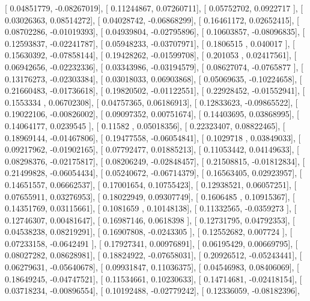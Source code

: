 \documentclass{article}
\begin{document}
       [ 0.04851779, -0.08267019],
       [ 0.11244867,  0.07260711],
       [ 0.05752702,  0.0922717 ],
       [ 0.03026363,  0.08514272],
       [ 0.04028742, -0.06868299],
       [ 0.16461172,  0.02652415],
       [ 0.08702286, -0.01019393],
       [ 0.04939804, -0.02795896],
       [ 0.10603857, -0.08096835],
       [ 0.12593837, -0.02241787],
       [ 0.05948233, -0.03707971],
       [ 0.1806515 ,  0.040017  ],
       [ 0.15630392, -0.07858144],
       [ 0.19428262, -0.01599708],
       [ 0.201053  ,  0.02417561],
       [ 0.06942656, -0.02232336],
       [ 0.03343986, -0.03194579],
       [ 0.08627074, -0.0765877 ],
       [ 0.13176273, -0.02303384],
       [ 0.03018033,  0.06903868],
       [ 0.05069635, -0.10224658],
       [ 0.21660483, -0.01736618],
       [ 0.19820502, -0.01122551],
       [ 0.22928452, -0.01552941],
       [ 0.1553334 ,  0.06702308],
       [ 0.04757365,  0.06186913],
       [ 0.12833623, -0.09865522],
       [ 0.19022106, -0.00826002],
       [ 0.09097352,  0.00751674],
       [ 0.14403695,  0.03868995],
       [ 0.14064177,  0.0239545 ],
       [ 0.11582   ,  0.05018356],
       [ 0.22323407,  0.08822465],
       [ 0.18969144, -0.01467806],
       [ 0.19477558, -0.06054841],
       [ 0.1029718 ,  0.03849033],
       [ 0.09217962, -0.01902165],
       [ 0.07792477,  0.01885213],
       [ 0.11053442,  0.04149633],
       [ 0.08298376, -0.02175817],
       [ 0.08206249, -0.02848457],
       [ 0.21508815, -0.01812834],
       [ 0.21499828, -0.06054434],
       [ 0.05240672, -0.06714379],
       [ 0.16563405,  0.02923957],
       [ 0.14651557,  0.06662537],
       [ 0.17001654,  0.10755423],
       [ 0.12938521,  0.06057251],
       [ 0.07655911,  0.03276953],
       [ 0.18022949,  0.09307749],
       [ 0.1606485 ,  0.10915367],
       [ 0.14351769,  0.03115661],
       [ 0.1081659 ,  0.10148138],
       [ 0.11332565, -0.0359273 ],
       [ 0.12746307,  0.00481647],
       [ 0.16987146,  0.0618398 ],
       [ 0.12731795,  0.04792353],
       [ 0.04538238,  0.08219291],
       [ 0.16907808, -0.0243305 ],
       [ 0.12552682,  0.007724  ],
       [ 0.07233158, -0.0642491 ],
       [ 0.17927341,  0.00976891],
       [ 0.06195429,  0.00669795],
       [ 0.08027282,  0.08628981],
       [ 0.18824922, -0.07658031],
       [ 0.20926512, -0.05243441],
       [ 0.06279631, -0.05640678],
       [ 0.09931847,  0.11036375],
       [ 0.04546983,  0.08406069],
       [ 0.18649245, -0.04747521],
       [ 0.11534661,  0.10230633],
       [ 0.14714681, -0.02418154],
       [ 0.03718234, -0.00896554],
       [ 0.10192488, -0.02779242],
       [ 0.12336059, -0.08182396],
\end{document}
